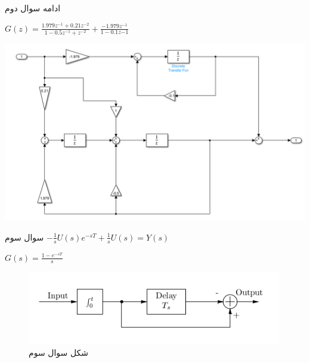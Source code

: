 \documentclass{article}
\begin{document}
    \begin{problem}{ادامه سوال دوم}
    	\raggedleft
    	
    	
    	$G(z) = \frac{1.979z^{-1} + 0.21z^{-2}}{1 - 0.5z^{-1} + z^{-2}} + \frac{-1.979z^{-1}}{1 - 0.1z{-1}}$
    	
    	\includegraphics[width=\linewidth]{Second Series/18.png}
    \end{problem}
    
    \begin{problem}{سوال سوم}
    	\raggedleft
    	$-\frac{1}{s}U(s)e^{-sT} + \frac{1}{s}U(s) = Y(s)$
    	
    	
    	$G(s) = \frac{1-e^{-sT}}{s}$ 
    	
    	
    \end{problem}
    \begin{figure}[htbp]
    	\centering
    	\includegraphics{Second Series/4.png}
    	\caption{شکل سوال سوم}
    \end{figure}
    
\end{document}
